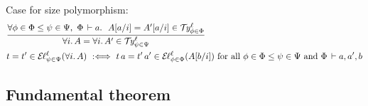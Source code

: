 \documentclass[acmsmall,screen]{acmart}\settopmatter{}
\renewcommand{\forallT}[2]{\forall #1.\,#2}
\begin{document}
Case for size polymorphism:
\begin{align*}
  & \ru{\forall \phi \in \Phi \leq \psi \in \Psi,\
        \Phi \der a.\ \
        \subst a i A = \subst a i {A'} \in \TY \Phi \phi \ell
      }{\forallT i A = \forallT i {A'} \in \TY \Psi \psi \ell}
\\
  & t = t' \in \EL \Psi \psi \ell {\forallT i A}
    \defas
    t\,a = t'\,a' \in \EL \Phi \phi \ell {\subst b i A}
    \mforall \phi \in \Phi \leq \psi \in \Psi
    \mand \Phi \der a,a',b
\end{align*}


\subsection{Fundamental theorem}








\end{document}
